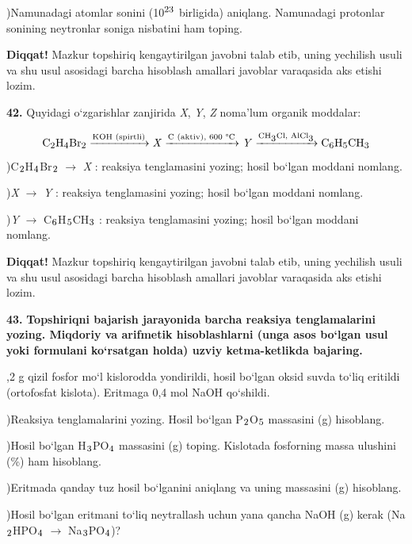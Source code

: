 \documentclass[11pt,a4paper]{article}
\renewcommand{\textsubscript}[1]{\ensuremath{_{\text{\fontsize{8}{8}\selectfont #1}}}}
\renewcommand{\textsuperscript}[1]{\ensuremath{^{\text{\fontsize{8}{8}\selectfont #1}}}}
\newcommand{\diqqat}[1]{\par\smallskip\noindent\textbf{Diqqat!} #1\par\medskip}
\begin{document}
)Namunadagi atomlar sonini (10\textsuperscript{23} birligida) aniqlang. Namunadagi protonlar sonining neytronlar soniga nisbatini ham toping.\par
\diqqat{Mazkur topshiriq kengaytirilgan javobni talab etib, uning yechilish usuli va shu usul asosidagi barcha hisoblash amallari javoblar varaqasida aks etishi lozim.}
\noindent\textbf{42.} Quyidagi o`zgarishlar zanjirida \textit{X}, \textit{Y}, \textit{Z} noma'lum organik moddalar:\par
\[\setlength{\fboxsep}{0pt}\text{C\textsubscript{2}H\textsubscript{4}Br\textsubscript{2}}\xrightarrow{\text{KOH (spirtli)}}\text{\textit{X}}\xrightarrow{\text{C (aktiv), 600 \textdegree{}C}}\text{\textit{Y}}\xrightarrow{\text{CH\textsubscript{3}Cl, AlCl\textsubscript{3}}}\text{C\textsubscript{6}H\textsubscript{5}CH\textsubscript{3}}\]
)C\textsubscript{2}H\textsubscript{4}Br\textsubscript{2} $\to$ \textit{X} : reaksiya tenglamasini yozing; hosil bo`lgan moddani nomlang.\par
{})\textit{X} $\to$ \textit{Y} : reaksiya tenglamasini yozing; hosil bo`lgan moddani nomlang.\par
{})\textit{Y} $\to$ C\textsubscript{6}H\textsubscript{5}CH\textsubscript{3} : reaksiya tenglamasini yozing; hosil bo`lgan moddani nomlang.\par
\diqqat{Mazkur topshiriq kengaytirilgan javobni talab etib, uning yechilish usuli va shu usul asosidagi barcha hisoblash amallari javoblar varaqasida aks etishi lozim.}
\noindent\textbf{43.} \textbf{Topshiriqni bajarish jarayonida barcha reaksiya tenglamalarini yozing. Miqdoriy va arifmetik hisoblashlarni (unga asos bo`lgan usul yoki formulani ko`rsatgan holda) uzviy ketma-ketlikda bajaring.}\par{},2 g qizil fosfor mo`l kislorodda yondirildi, hosil bo`lgan oksid suvda to`liq eritildi (ortofosfat kislota). Eritmaga 0,4 mol NaOH qo`shildi.\par
{})Reaksiya tenglamalarini yozing. Hosil bo`lgan P\textsubscript{2}O\textsubscript{5} massasini (g) hisoblang.\par
{})Hosil bo`lgan H\textsubscript{3}PO\textsubscript{4} massasini (g) toping. Kislotada fosforning massa ulushini (\%) ham hisoblang.\par
{})Eritmada qanday tuz hosil bo`lganini aniqlang va uning massasini (g) hisoblang.\par
{})Hosil bo`lgan eritmani to`liq neytrallash uchun yana qancha NaOH (g) kerak (Na\textsubscript{2}HPO\textsubscript{4} $\to$ Na\textsubscript{3}PO\textsubscript{4})?\par
\end{document}
